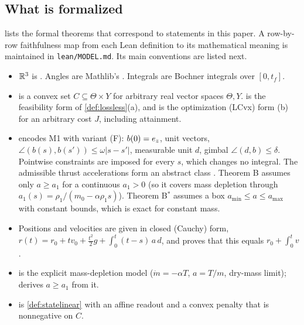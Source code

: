 \subsection{What is formalized}
 lists the formal theorems that correspond to statements in this paper. A row-by-row faithfulness map from each
Lean definition to its mathematical meaning is maintained in \texttt{lean/MODEL.md}. Its main conventions are listed next.
\begin{itemize}[leftmargin=*,itemsep=2pt]
\item $\mathbb{R}^3$ is . Angles are Mathlib's . Integrals are Bochner
integrals over $[0,t_f]$.
\item {} is a convex set $C\subseteq\Theta\times Y$ for arbitrary real vector spaces $\Theta,Y$.
 is the feasibility form of \cref{def:lossless}(a), and  is the optimization (LCvx) form
(b) for an arbitrary cost $J$, including attainment.
\item {} encodes M1 with variant (F): $b(0)=e_z$, unit vectors,
$\angle(b(s),b(s'))\le\omega|s-s'|$, measurable unit $d$, gimbal $\angle(d,b)\le\delta$. Pointwise constraints are imposed for every $s$,
which changes no integral. The admissible thrust accelerations form an abstract class . Theorem B assumes only
$a\ge a_1$ for a continuous $a_1>0$ (so it covers mass depletion through $a_1(s)=\rho_1/(m_0-\alpha\rho_1s)$). Theorem B$^*$ assumes a
box $a_{\min}\le a\le a_{\max}$ with constant bounds, which is exact for constant mass.
\item Positions and velocities are given in closed (Cauchy) form, $r(t)=r_0+tv_0+\tfrac{t^2}2g+\int_0^t(t-s)\,a\,d$, and
 proves that this equals $r_0+\int_0^tv$.
\item {} is the explicit mass-depletion model ($\dot m=-\alpha T$, $a=T/m$, dry-mass limit);  derives
$a\ge a_1$ from it.
\item {} is \cref{def:statelinear} with an affine readout and a convex penalty that is nonnegative on $C$.
\end{itemize}

